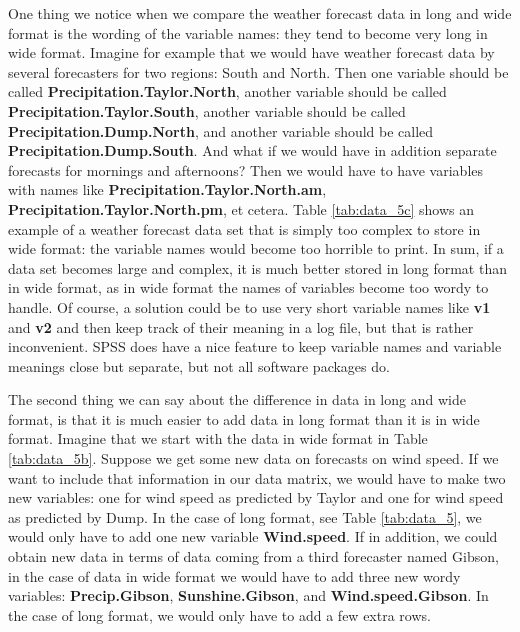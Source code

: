 \documentclass[]{report}\usepackage[]{graphicx}\usepackage[]{color}
\begin{document}
One thing we notice when we compare the weather forecast data in long and wide format is the wording of the variable names: they tend to become very long in wide format. Imagine for example that we would have weather forecast data by several forecasters for two regions: South and North. Then one variable should be called \textbf{Precipitation.Taylor.North}, another variable should be called \textbf{Precipitation.Taylor.South}, another variable should be called \textbf{Precipitation.Dump.North}, and another variable should be called \textbf{Precipitation.Dump.South}. And what if we would have in addition separate forecasts for mornings and afternoons? Then we would have to have variables with names like \textbf{Precipitation.Taylor.North.am}, \textbf{Precipitation.Taylor.North.pm}, et cetera. Table \ref{tab:data_5c} shows an example of a weather forecast data set that is simply too complex to store in wide format: the variable names would become too horrible to print. In sum, if a data set becomes large and complex, it is much better stored in long format than in wide format, as in wide format the names of variables become too wordy to handle. Of course, a solution could be to use very short variable names like \textbf{v1} and \textbf{v2} and then keep track of their meaning in a log file, but that is rather inconvenient. SPSS does have a nice feature to keep variable names and variable meanings close but separate, but not all software packages do.

The second thing we can say about the difference in data in long and wide format, is that it is much easier to add data in long format than it is in wide format. Imagine that we start with the data in wide format in Table \ref{tab:data_5b}. Suppose we get some new data on forecasts on wind speed. If we want to include that information in our data matrix, we would have to make two new variables: one for wind speed as predicted by Taylor and one for wind speed as predicted by Dump. In the case of long format, see Table \ref{tab:data_5}, we would only have to add one new variable \textbf{Wind.speed}. If in addition, we could obtain new data in terms of data coming from a third forecaster named Gibson, in the case of data in wide format we would have to add three new wordy variables: \textbf{Precip.Gibson}, \textbf{Sunshine.Gibson}, and \textbf{Wind.speed.Gibson}. In the case of long format, we would only have to add a few extra rows.
\end{document}
